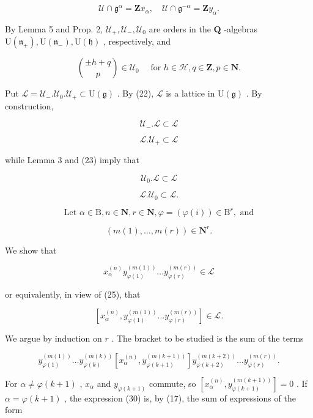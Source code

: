 \[
\mathcal {U} \cap \mathfrak {g} ^ {\alpha} = \mathbf {Z} x _ {\alpha}, \quad \mathcal {U} \cap \mathfrak {g} ^ {- \alpha} = \mathbf {Z} y _ {\alpha}.
\]

By Lemma 5 and Prop. 2, \(\mathcal{U}_{+},\mathcal{U}_{-},\mathcal{U}_{0}\) are orders in the \(\mathbf{Q}\) -algebras \(\mathrm{U}(\mathfrak{n}_{+}),\mathrm{U}(\mathfrak{n}_{-}),\mathrm{U}(\mathfrak{h})\) , respectively, and

\[
\binom{\pm h + q}{p} \in \mathcal {U} _ {0} \quad \text { for } h \in \mathcal {H}, q \in \mathbf {Z}, p \in \mathbf {N}.\tag{23}
\]

Put \(\mathcal{L} = \mathcal{U}_{-}. \mathcal{U}_{0}. \mathcal{U}_{+} \subset \mathrm{U}(\mathfrak{g})\) . By (22), \(\mathcal{L}\) is a lattice in \(\mathrm{U}(\mathfrak{g})\) . By construction,

\[
\mathcal {U} _ {-}. \mathcal {L} \subset \mathcal {L}\tag{24}
\]

\[
\mathcal {L}. \mathcal {U} _ {+} \subset \mathcal {L}\tag{25}
\]

while Lemma 3 and (23) imply that

\[
\mathcal {U} _ {0}. \mathcal {L} \subset \mathcal {L}\tag{26}
\]

\[
\mathcal {L}. \mathcal {U} _ {0} \subset \mathcal {L}.\tag{27}
\]

\[
\text {   Let   } \alpha \in \mathrm{B}, n \in \mathbf {N}, r \in \mathbf {N}, \varphi = (\varphi (i)) \in \mathrm{B} ^ {r}, \text {   and   }
\]

\[
(m (1), \dots , m (r)) \in \mathbf {N} ^ {r}.
\]

We show that

\[
x _ {\alpha} ^ {(n)} y _ {\varphi (1)} ^ {(m (1))} \dots y _ {\varphi (r)} ^ {(m (r))} \in \mathcal {L}\tag{28}
\]

or equivalently, in view of (25), that

\[
[ x _ {\alpha} ^ {(n)}, y _ {\varphi (1)} ^ {(m (1))} \dots y _ {\varphi (r)} ^ {(m (r))} ] \in \mathcal {L}.\tag{29}
\]

We argue by induction on \(r\) . The bracket to be studied is the sum of the terms

\[
y _ {\varphi (1)} ^ {(m (1))} \dots y _ {\varphi (k)} ^ {(m (k))} [ x _ {\alpha} ^ {(n)}, y _ {\varphi (k + 1)} ^ {(m (k + 1))} ] y _ {\varphi (k + 2)} ^ {(m (k + 2))} \dots y _ {\varphi (r)} ^ {(m (r))}.\tag{30}
\]

For \(\alpha \neq \varphi (k + 1)\) , \(x_{\alpha}\) and \(y_{\varphi (k + 1)}\) commute, so \([x_{\alpha}^{(n)},y_{\varphi (k + 1)}^{(m(k + 1))}] = 0\) . If \(\alpha = \varphi (k + 1)\) , the expression (30) is, by (17), the sum of expressions of the form

